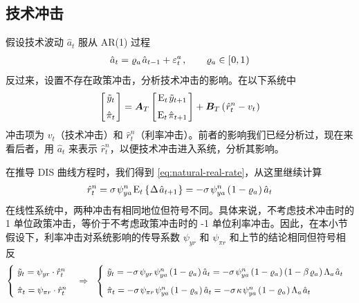 \subsection{技术冲击}

假设技术波动 \(\hat a_t\) 服从 AR(1) 过程
\begin{align*}
    \hat a_t=\varrho_a\,\hat a\lt+\varepsilon_t^a\,,\qquad\varrho_a\in\bksa{0,1}
\end{align*}
反过来，设置不存在政策冲击，分析技术冲击的影响。在以下系统中
\begin{align*}
    \matbks{
        \tilde y_t \\[6pt]
        \hat \pi_t
    } =
    \bsA_T\matbks{
        \meant\,\tilde y\nt \\[6pt]
        \meant\,\hat\pi\nt
    } +
    \bs B_T\bka{\hat r^n_t-v_t}
\end{align*}
冲击项为 \(v_t\)（技术冲击）和 \(\hat r^n_t\)（利率冲击）。前者的影响我们已经分析过，现在来看后者，用 \(\hat a_t\) 来表示 \(\hat r^n_t\)，以便技术冲击进入系统，分析其影响。

在推导 DIS 曲线方程时，我们得到 \ref{eq:natural-real-rate}，从这里继续计算
\begin{align*}
    \hat r^n_t=\sigma\,\psi^n_{ya}\,\meant\bkd{\D\hat a\nt}=-\sigma\,\psi^n_{ya}\bka{1-\varrho_a}\hat a_t
\end{align*}
在线性系统中，两种冲击有相同地位但符号不同。具体来说，不考虑技术冲击时的 1 单位政策冲击，等价于不考虑政策冲击时的 -1 单位利率冲击。因此，在本小节假设下，利率冲击对系统影响的传导系数 \(\psi_{yr}\) 和 \(\psi_{\pi r}\) 和上节的结论相同但符号相反
\begin{align*}
    \begin{cases}
        \ \tilde y_t=\psi_{yr}\cdot\hat r^n_t\\[6pt]
        \ \hat\pi_t=\psi_{\pi r}\cdot\hat r^n_t
    \end{cases} \Rightarrow \ \
    \begin{cases}
        \ \tilde y_t=-\sigma\,\psi_{yr}\,\psi^n_{ya}\bka{1-\varrho_a}\hat a_t=-\sigma\,\psi^n_{ya}\bka{1-\varrho_a}\bka{1-\beta\,\varrho_a}\Lambda_a\,\hat a_t\\[6pt]
        \ \hat\pi_t=-\sigma\,\psi_{\pi r}\,\psi^n_{ya}\bka{1-\varrho_a}\hat a_t=-\sigma\,\kappa\,\psi^n_{ya}\bka{1-\varrho_a}\Lambda_a\,\hat a_t
    \end{cases}
\end{align*}

